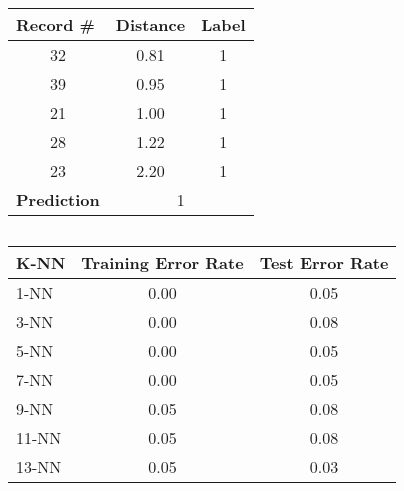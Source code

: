 \documentclass [11pt]{article}
\begin{document}
\subsection{}
\begin{table}[H]
\begin{tabular}{|c|c|c|}
\hline
\multicolumn{1}{|l|}{\textbf{Record \#}}  & \multicolumn{1}{l|}{\textbf{Distance}} & \multicolumn{1}{l|}{\textbf{Label}} \\ \hline
32                                        & 0.81                                   & 1                                   \\ \hline
39                                        & 0.95                                   & 1                                   \\ \hline
21                                        & 1.00                                   & 1                                   \\ \hline
28                                        & 1.22                                   & 1                                   \\ \hline
23                                        & 2.20                                   & 1                                   \\ \hline
\multicolumn{1}{|l|}{\textbf{Prediction}} & \multicolumn{2}{c|}{1}                                                       \\ \hline
\end{tabular}
\end{table}
\subsection{}
\begin{table}[H]
\begin{tabular}{|l|c|c|}
\hline
\textbf{K-NN} & \multicolumn{1}{l|}{\textbf{Training Error Rate}} & \multicolumn{1}{l|}{\textbf{Test Error Rate}} \\ \hline
1-NN          & 0.00                                              & 0.05                                          \\ \hline
3-NN          & 0.00                                              & 0.08                                          \\ \hline
5-NN          & 0.00                                              & 0.05                                          \\ \hline
7-NN          & 0.00                                              & 0.05                                          \\ \hline
9-NN          & 0.05                                              & 0.08                                          \\ \hline
11-NN         & 0.05                                              & 0.08                                          \\ \hline
13-NN         & 0.05                                              & 0.03                                          \\ \hline
\end{tabular}
\end{table}
\end{document}
